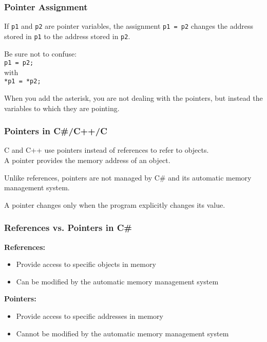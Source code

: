 \begin{frame}
\frametitle{Pointer Assignment}
If \texttt{p1} and \texttt{p2} are pointer variables, the assignment \texttt{p1 = p2} changes the address stored in \texttt{p1} to the address stored in \texttt{p2}.

Be sure not to confuse:\\
\texttt{p1 = p2;}\\
with \\
\texttt{*p1 = *p2;}

When you add the asterisk, you are not dealing with the pointers, but instead the variables to which they are pointing.

\end{frame}




\begin{frame}
\frametitle{Pointers in C\#/C++/C}



C and C++ use pointers  instead of references to refer to objects.\\
\quad A pointer provides the memory address of an object.

Unlike references, pointers are not managed by C\# and its automatic memory management system.

A pointer changes only when the program explicitly changes its value.

\end{frame}



\begin{frame}
\frametitle{References vs. Pointers in C\#}

\textbf{References:}
\begin{itemize}
	\item Provide access to specific objects in memory
	\item Can be modified by the automatic memory management system
\end{itemize}

\textbf{Pointers:}
\begin{itemize}
	\item Provide access to specific addresses in memory
	\item Cannot be modified by the automatic memory management system
\end{itemize}

\end{frame}





